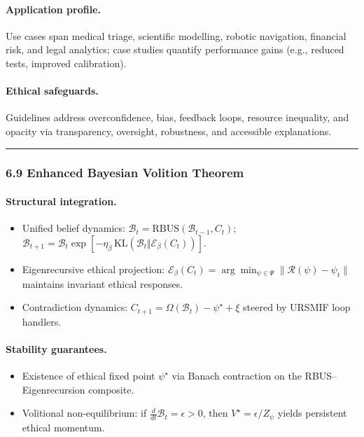 \documentclass[12pt]{article}
\begin{document}
\paragraph{Application profile.}
Use cases span medical triage, scientific modelling, robotic navigation, financial risk, and legal analytics; case studies quantify performance gains (e.g., reduced tests, improved calibration).

\paragraph{Ethical safeguards.}
Guidelines address overconfidence, bias, feedback loops, resource inequality, and opacity via transparency, oversight, robustness, and accessible explanations.

\begin{center}\rule{0.5\linewidth}{0.5pt}\end{center}

\subsubsection{\texorpdfstring{\textbf{6.9 Enhanced Bayesian Volition Theorem}}{6.9 Enhanced Bayesian Volition Theorem}}\label{bayesian-volition-framework}

\paragraph{Structural integration.}
\begin{itemize}
\item Unified belief dynamics: $\mathcal{B}_{t} = \mathrm{RBUS}(\mathcal{B}_{t-1}, C_t)$; $\mathcal{B}_{t+1} = \mathcal{B}_t \exp[-\eta_\beta\, \mathrm{KL}(\mathcal{B}_t \Vert \mathcal{E}_\beta(C_t))]$.
\item Eigenrecursive ethical projection: $\mathcal{E}_\beta(C_t) = \arg\min_{\psi \in \Psi} \|\mathcal{R}(\psi) - \psi_t\|$ maintains invariant ethical responses.
\item Contradiction dynamics: $C_{t+1} = \Omega(\mathcal{B}_t) - \psi^\star + \xi$ steered by URSMIF loop handlers.
\end{itemize}

\paragraph{Stability guarantees.}
\begin{itemize}
\item Existence of ethical fixed point $\psi^\star$ via Banach contraction on the RBUS–Eigenrecursion composite.
\item Volitional non-equilibrium: if $\frac{d}{dt}\mathcal{B}_t = \epsilon >0$, then $V^\star = \epsilon/Z_\psi$ yields persistent ethical momentum.
\end{itemize}
\end{document}
